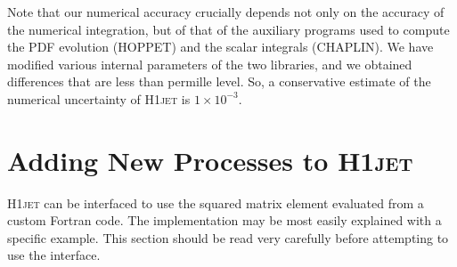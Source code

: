 \documentclass[12pt]{article}
\begin{document}
\begin{figure}[tbh]
\begin{minipage}{.485\textwidth}
  \label{fig:susyresum}
\end{minipage}
\end{figure}

Note that our numerical accuracy crucially depends not only on the
accuracy of the numerical integration, but of that of the auxiliary
programs used to compute the PDF evolution (\textsc{HOPPET}) and the
scalar integrals (\textsc{CHAPLIN}). We have modified various internal
parameters of the two libraries, and we obtained differences that are
less than permille level. So, a conservative estimate of the numerical
uncertainty of \textsc{H1jet} is $1\times 10^{-3}$.

\section{Adding New Processes to \textsc{H1jet}}
\label{sec:newprocs} 
\textsc{H1jet} can be interfaced to use the squared matrix element
evaluated from a custom Fortran code. The implementation may be most
easily explained with a specific example. This section should be read very 
carefully before attempting to use the interface.
\end{document}
